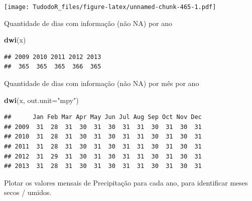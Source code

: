 \documentclass[
]{book}
\newenvironment{Shaded}{\begin{snugshade}}{\end{snugshade}}
\newcommand{\CommentTok}[1]{\textcolor[rgb]{0.56,0.35,0.01}{\textit{#1}}}
\newcommand{\DataTypeTok}[1]{\textcolor[rgb]{0.13,0.29,0.53}{#1}}
\newcommand{\DecValTok}[1]{\textcolor[rgb]{0.00,0.00,0.81}{#1}}
\newcommand{\KeywordTok}[1]{\textcolor[rgb]{0.13,0.29,0.53}{\textbf{#1}}}
\newcommand{\NormalTok}[1]{#1}
\newcommand{\OtherTok}[1]{\textcolor[rgb]{0.56,0.35,0.01}{#1}}
\newcommand{\StringTok}[1]{\textcolor[rgb]{0.31,0.60,0.02}{#1}}
\begin{document}
\texttt{[image: TudodoR\_files/figure-latex/unnamed-chunk-465-1.pdf]}

Quantidade de dias com informação (não NA) por ano

\begin{Shaded}
\begin{Highlighting}[]
\KeywordTok{dwi}\NormalTok{(x)}
\end{Highlighting}
\end{Shaded}

\begin{verbatim}
## 2009 2010 2011 2012 2013 
##  365  365  365  366  365
\end{verbatim}

Quantidade de dias com informação (não NA) por mês por ano

\begin{Shaded}
\begin{Highlighting}[]
\KeywordTok{dwi}\NormalTok{(x, }\DataTypeTok{out.unit=}\StringTok{"mpy"}\NormalTok{)}
\end{Highlighting}
\end{Shaded}

\begin{verbatim}
##      Jan Feb Mar Apr May Jun Jul Aug Sep Oct Nov Dec
## 2009  31  28  31  30  31  30  31  31  30  31  30  31
## 2010  31  28  31  30  31  30  31  31  30  31  30  31
## 2011  31  28  31  30  31  30  31  31  30  31  30  31
## 2012  31  29  31  30  31  30  31  31  30  31  30  31
## 2013  31  28  31  30  31  30  31  31  30  31  30  31
\end{verbatim}

Plotar os valores mensais de Precipitação para cada ano, para identificar meses secos / umidos.

\begin{Shaded}
\end{Shaded}
\end{document}
